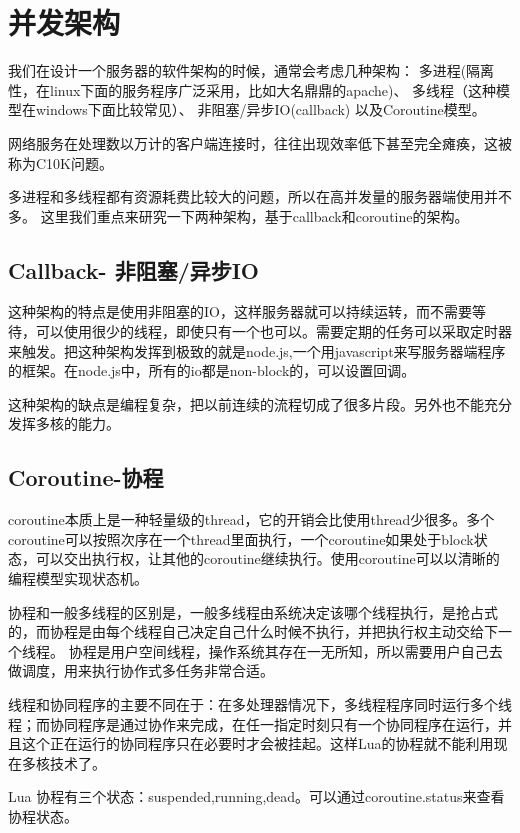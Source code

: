 \section{并发架构}
我们在设计一个服务器的软件架构的时候，通常会考虑几种架构：
多进程(隔离性，在linux下面的服务程序广泛采用，比如大名鼎鼎的apache)、
多线程（这种模型在windows下面比较常见）、
非阻塞/异步IO(callback) 以及Coroutine模型。

网络服务在处理数以万计的客户端连接时，往往出现效率低下甚至完全瘫痪，这被称为C10K问题。

多进程和多线程都有资源耗费比较大的问题，所以在高并发量的服务器端使用并不多。
这里我们重点来研究一下两种架构，基于callback和coroutine的架构。




\subsection{Callback- 非阻塞/异步IO}
这种架构的特点是使用非阻塞的IO，这样服务器就可以持续运转，而不需要等待，可以使用很少的线程，即使只有一个也可以。需要定期的任务可以采取定时器来触发。把这种架构发挥到极致的就是node.js,一个用javascript来写服务器端程序的框架。在node.js中，所有的io都是non-block的，可以设置回调。

这种架构的缺点是编程复杂，把以前连续的流程切成了很多片段。另外也不能充分发挥多核的能力。
\subsection{Coroutine-协程}
coroutine本质上是一种轻量级的thread，它的开销会比使用thread少很多。多个coroutine可以按照次序在一个thread里面执行，一个coroutine如果处于block状态，可以交出执行权，让其他的coroutine继续执行。使用coroutine可以以清晰的编程模型实现状态机。

协程和一般多线程的区别是，一般多线程由系统决定该哪个线程执行，是抢占式的，而协程是由每个线程自己决定自己什么时候不执行，并把执行权主动交给下一个线程。 协程是用户空间线程，操作系统其存在一无所知，所以需要用户自己去做调度，用来执行协作式多任务非常合适。

线程和协同程序的主要不同在于：在多处理器情况下，多线程程序同时运行多个线程；而协同程序是通过协作来完成，在任一指定时刻只有一个协同程序在运行，并且这个正在运行的协同程序只在必要时才会被挂起。这样Lua的协程就不能利用现在多核技术了。

Lua 协程有三个状态：suspended,running,dead。可以通过coroutine.status来查看协程状态。


